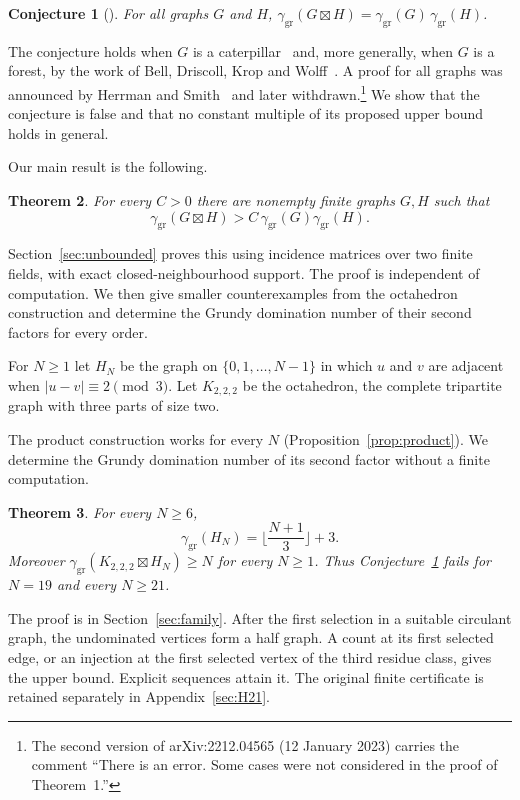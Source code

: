 \documentclass[screen]{aomart}
\newtheorem{theorem}{Theorem}[section]
\newtheorem{conjecture}[theorem]{Conjecture}
\theoremstyle{definition}
\theoremstyle{remark}
\numberwithin{equation}{section}
\newcommand{\ggr}{\gamma_{\mathrm{gr}}}
\newcommand{\sprod}{\boxtimes}
\newcommand{\oct}{K_{2,2,2}}
\begin{document}
\begin{conjecture}[{\cite[Conjecture~22]{BBG}}]\label{conj}
For all graphs $G$ and $H$, $\ggr(G\sprod H)=\ggr(G)\,\ggr(H)$.
\end{conjecture}

The conjecture holds when $G$ is a caterpillar~\cite{BBG} and, more generally, when $G$ is a forest, by the work of Bell, Driscoll, Krop and Wolff~\cite{BDKW}. A proof for all graphs was announced by Herrman and Smith~\cite{HS} and later withdrawn.\footnote{The second version of arXiv:2212.04565 (12 January 2023) carries the comment ``There is an error. Some cases were not considered in the proof of Theorem~1.''} We show that the conjecture is false and that no constant multiple of its proposed upper bound holds in general.

Our main result is the following.

\begin{theorem}\label{thm:unbounded}
For every $C>0$ there are nonempty finite graphs $G,H$ such that
\[
 \ggr(G\sprod H)>C\,\ggr(G)\ggr(H).
\]
\end{theorem}

Section~\ref{sec:unbounded} proves this using incidence matrices over two finite fields, with exact closed-neighbourhood support. The proof is independent of computation. We then give smaller counterexamples from the octahedron construction and determine the Grundy domination number of their second factors for every order.

For $N\ge1$ let $H_N$ be the graph on $\{0,1,\dots,N-1\}$ in which $u$ and $v$ are adjacent when $|u-v|\equiv2\pmod 3$. Let $\oct$ be the octahedron, the complete tripartite graph with three parts of size two.

The product construction works for every $N$ (Proposition~\ref{prop:product}). We determine the Grundy domination number of its second factor without a finite computation.

\begin{theorem}\label{thm:family}
For every $N\ge6$,
\[
 \ggr(H_N)=\Big\lfloor\frac{N+1}{3}\Big\rfloor+3.
\]
Moreover $\ggr(\oct\sprod H_N)\ge N$ for every $N\ge1$. Thus Conjecture~\ref{conj} fails for $N=19$ and every $N\ge21$.
\end{theorem}

The proof is in Section~\ref{sec:family}. After the first selection in a suitable circulant graph, the undominated vertices form a half graph. A count at its first selected edge, or an injection at the first selected vertex of the third residue class, gives the upper bound. Explicit sequences attain it. The original finite certificate is retained separately in Appendix~\ref{sec:H21}.
\end{document}
